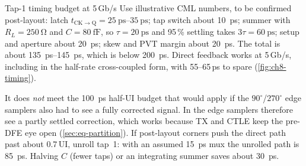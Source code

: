 \begin{example}{Tap-1 timing budget at 5\,Gb/s}\label{we:ch8-timing}
Use illustrative \sgx{} CML numbers, to be confirmed post-layout: latch $t_\mathrm{CK\to Q}=\qtyrange{25}{35}{\pico\second}$; tap switch about \qty{10}{\pico\second}; summer with $R_L=\qty{250}{\ohm}$ and $C=\qty{80}{\femto\farad}$, so $\tau=\qty{20}{\pico\second}$ and 95\,\% settling takes $3\tau=\qty{60}{\pico\second}$; setup and aperture about \qty{20}{\pico\second}; skew and PVT margin about \qty{20}{\pico\second}. The total is about \qtyrange{135}{145}{\pico\second}, which is below \qty{200}{\pico\second}. Direct feedback works at 5\,Gb/s, including in the half-rate cross-coupled form, with 55--65\,ps to spare (\cref{fig:ch8-timing}).

It does \emph{not} meet the \qty{100}{\pico\second} half-UI budget that would apply if the $90^\circ$/$270^\circ$ edge samplers also had to see a fully corrected signal. In \OS{} the edge samplers therefore see a partly settled correction, which works because TX and CTLE keep the pre-DFE eye open (\cref{sec:eq-partition}). If post-layout corners push the direct path past about 0.7\,UI, unroll tap~1: with an assumed \qty{15}{\pico\second} mux the unrolled path is \qty{85}{\pico\second}. Halving $C$ (fewer taps) or an integrating summer saves about \qty{30}{\pico\second}.
\end{example}

